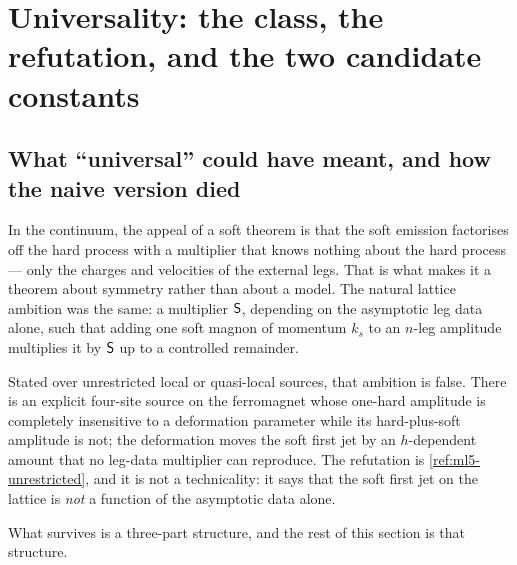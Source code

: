 
\section{Universality: the class, the refutation, and the two candidate constants}
\label{sec:universality}

\subsection{What ``universal'' could have meant, and how the naive version died}

In the continuum, the appeal of a soft theorem is that the soft emission
factorises off the hard process with a multiplier that knows nothing about the
hard process --- only the charges and velocities of the external legs. That is
what makes it a theorem about symmetry rather than about a model. The natural
lattice ambition was the same: a multiplier $\mathsf{S}$, depending on the
asymptotic leg data alone, such that adding one soft magnon of momentum $k_s$
to an $n$-leg amplitude multiplies it by $\mathsf{S}$ up to a controlled
remainder.

Stated over unrestricted local or quasi-local sources, that ambition is
false. There is an explicit four-site source on the ferromagnet whose
one-hard amplitude is completely insensitive to a deformation parameter while
its hard-plus-soft amplitude is not; the deformation moves the soft first jet
by an $h$-dependent amount that no leg-data multiplier can reproduce. The
refutation is \cref{ref:ml5-unrestricted}, and it is not a technicality: it
says that the soft first jet on the lattice is \emph{not} a function of the
asymptotic data alone.

What survives is a three-part structure, and the rest of this section is that
structure.

